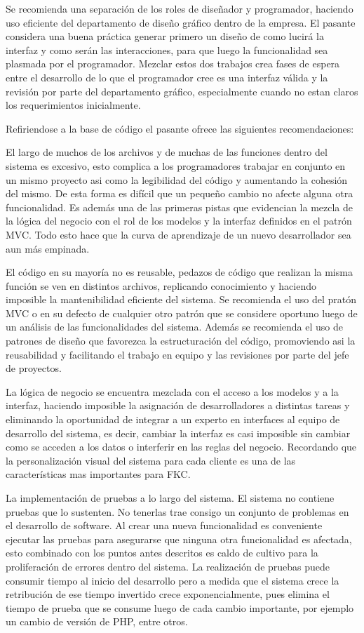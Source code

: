 Se recomienda una separación de los roles de diseñador y programador, haciendo uso eficiente del departamento de diseño gráfico dentro de la empresa. El pasante considera una buena práctica generar primero un diseño de como lucirá la interfaz y como serán las interacciones, para que luego la funcionalidad sea plasmada por el programador. Mezclar estos dos trabajos crea fases de espera entre el desarrollo de lo que el programador cree es una interfaz válida y la revisión por parte del departamento gráfico, especialmente cuando no estan claros los requerimientos inicialmente.

Refiriendose a la base de código el pasante ofrece las siguientes recomendaciones:

El largo de muchos de los archivos y de muchas de las funciones dentro del sistema es excesivo, esto complica a los programadores trabajar en conjunto en un mismo proyecto asi como la legibilidad del código y aumentando la cohesión del mismo. De esta forma es difícil que un pequeño cambio no afecte alguna otra funcionalidad. Es además una de las primeras pistas que evidencian la mezcla de la lógica del negocio con el rol de los modelos y la interfaz definidos en el patrón MVC. Todo esto hace que la curva de aprendizaje de un nuevo desarrollador sea aun más empinada.

El código en su mayoría no es reusable, pedazos de código que realizan la misma función se ven en distintos archivos, replicando conocimiento y haciendo imposible la mantenibilidad eficiente del sistema. Se recomienda el uso del pratón MVC o en su defecto de cualquier otro patrón que se considere oportuno luego de un análisis de las funcionalidades del sistema. Además se recomienda el uso de patrones de diseño que favorezca la estructuración del código, promoviendo asi la reusabilidad y facilitando el trabajo en equipo y las revisiones por parte del jefe de proyectos.

La lógica de negocio se encuentra mezclada con el acceso a los modelos y a la interfaz, haciendo imposible la asignación de desarrolladores a distintas tareas y eliminando la oportunidad de integrar a un experto en interfaces al equipo de desarrollo del sistema, es decir, cambiar la interfaz es casi imposible sin cambiar como se acceden a los datos o interferir en las reglas del negocio. Recordando que la personalización visual del sistema para cada cliente es una de las características mas importantes para FKC.

La implementación de pruebas a lo largo del sistema. El sistema no contiene pruebas que lo sustenten. No tenerlas trae consigo un conjunto de problemas en el desarrollo de software. Al crear una nueva funcionalidad es conveniente ejecutar las pruebas para asegurarse que ninguna otra funcionalidad es afectada, esto combinado con los puntos antes descritos es caldo de cultivo para la proliferación de errores dentro del sistema. La realización de pruebas puede consumir tiempo al inicio del desarrollo pero a medida que el sistema crece la retribución de ese tiempo invertido crece exponencialmente, pues elimina el tiempo de prueba que se consume luego de cada cambio importante, por ejemplo un cambio de versión de PHP, entre otros.

